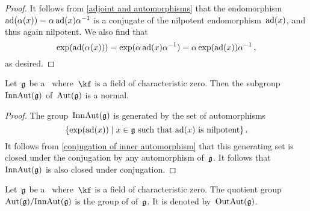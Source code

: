\begin{proof}
  It follows from \cref{adjoint and automorphisms} that the endomorphism~$\operatorname{ad}(\alpha(x)) = \alpha \operatorname{ad}(x) \alpha^{-1}$ is a conjugate of the nilpotent endomorphism~$\operatorname{ad}(x)$, and thus again nilpotent.
  We also find that
  \[
    \exp( \operatorname{ad}(\alpha(x)) )
    =
    \exp( \alpha \operatorname{ad}(x) \alpha^{-1} )
    =
    \alpha \exp(\operatorname{ad}(x)) \alpha^{-1} \,,
  \]
  as desired.
\end{proof}


\begin{proposition}
  Let~$\mathfrak{g}$ be a~\liealgebra{$\kf$} where~$\kf$ is a field of characteristic zero.
  Then the subgroup~$\operatorname{InnAut}(\mathfrak{g})$ of~$\operatorname{Aut}(\mathfrak{g})$ is a normal.
\end{proposition}


\begin{proof}
  The group~$\operatorname{InnAut}(\mathfrak{g})$ is generated by the set of automorphisms
  \[
    \{
      \exp(\ad(x))
    \suchthat
      \text{$x \in \glie$ such that~$\ad(x)$ is nilpotent}
    \} \,.
  \]
  It follows from \cref{conjugation of inner automorphism} that this generating set is closed under the conjugation by any automorphism of~$\mathfrak{g}$.
  It follows that~$\operatorname{InnAut}(\mathfrak{g})$ is also closed under conjugation.
\end{proof}


\begin{definition}
  Let~$\mathfrak{g}$ be a~\liealgebra{$\kf$} where~$\kf$ is a field of characteristic zero.
  The quotient group~$\operatorname{Aut}(\mathfrak{g}) / {\operatorname{InnAut}(\mathfrak{g})}$ is the group of  of~$\mathfrak{g}$.
  It is denoted by~$\operatorname{OutAut}(\mathfrak{g})$.
\end{definition}






